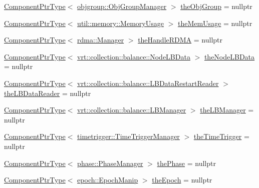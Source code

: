 \begin{DoxyCompactItemize}
\item 
\hyperlink{structvt_1_1runtime_1_1_runtime_a0893bf0a8c03b898e8ab66b52cec80ad}{Component\+Ptr\+Type}$<$ \hyperlink{structvt_1_1objgroup_1_1_obj_group_manager}{objgroup\+::\+Obj\+Group\+Manager} $>$ \hyperlink{structvt_1_1runtime_1_1_runtime_af2d01d5059edf4aed086f087e5ed1e91}{the\+Obj\+Group} = nullptr
\item 
\hyperlink{structvt_1_1runtime_1_1_runtime_a0893bf0a8c03b898e8ab66b52cec80ad}{Component\+Ptr\+Type}$<$ \hyperlink{structvt_1_1util_1_1memory_1_1_memory_usage}{util\+::memory\+::\+Memory\+Usage} $>$ \hyperlink{structvt_1_1runtime_1_1_runtime_a99d9a28de0742915ca6b25393807dd8b}{the\+Mem\+Usage} = nullptr
\item 
\hyperlink{structvt_1_1runtime_1_1_runtime_a0893bf0a8c03b898e8ab66b52cec80ad}{Component\+Ptr\+Type}$<$ \hyperlink{structvt_1_1rdma_1_1_manager}{rdma\+::\+Manager} $>$ \hyperlink{structvt_1_1runtime_1_1_runtime_a4772a2e3ae26f5dae29ea474ac0050c7}{the\+Handle\+R\+D\+MA} = nullptr
\item 
\hyperlink{structvt_1_1runtime_1_1_runtime_a0893bf0a8c03b898e8ab66b52cec80ad}{Component\+Ptr\+Type}$<$ \hyperlink{structvt_1_1vrt_1_1collection_1_1balance_1_1_node_l_b_data}{vrt\+::collection\+::balance\+::\+Node\+L\+B\+Data} $>$ \hyperlink{structvt_1_1runtime_1_1_runtime_a0a596fabff7d26a9417e8f7886410eee}{the\+Node\+L\+B\+Data} = nullptr
\item 
\hyperlink{structvt_1_1runtime_1_1_runtime_a0893bf0a8c03b898e8ab66b52cec80ad}{Component\+Ptr\+Type}$<$ \hyperlink{structvt_1_1vrt_1_1collection_1_1balance_1_1_l_b_data_restart_reader}{vrt\+::collection\+::balance\+::\+L\+B\+Data\+Restart\+Reader} $>$ \hyperlink{structvt_1_1runtime_1_1_runtime_afb8103d823cabc7bacb6035f785e9324}{the\+L\+B\+Data\+Reader} = nullptr
\item 
\hyperlink{structvt_1_1runtime_1_1_runtime_a0893bf0a8c03b898e8ab66b52cec80ad}{Component\+Ptr\+Type}$<$ \hyperlink{structvt_1_1vrt_1_1collection_1_1balance_1_1_l_b_manager}{vrt\+::collection\+::balance\+::\+L\+B\+Manager} $>$ \hyperlink{structvt_1_1runtime_1_1_runtime_a0d324f5964ce89e2974a41bc3129829e}{the\+L\+B\+Manager} = nullptr
\item 
\hyperlink{structvt_1_1runtime_1_1_runtime_a0893bf0a8c03b898e8ab66b52cec80ad}{Component\+Ptr\+Type}$<$ \hyperlink{structvt_1_1timetrigger_1_1_time_trigger_manager}{timetrigger\+::\+Time\+Trigger\+Manager} $>$ \hyperlink{structvt_1_1runtime_1_1_runtime_a3d72d73ecd4ba3f0104dca596eae3862}{the\+Time\+Trigger} = nullptr
\item 
\hyperlink{structvt_1_1runtime_1_1_runtime_a0893bf0a8c03b898e8ab66b52cec80ad}{Component\+Ptr\+Type}$<$ \hyperlink{structvt_1_1phase_1_1_phase_manager}{phase\+::\+Phase\+Manager} $>$ \hyperlink{structvt_1_1runtime_1_1_runtime_aaad9fd5e7f0bb2d4bcc73fe1ce60bd9f}{the\+Phase} = nullptr
\item 
\hyperlink{structvt_1_1runtime_1_1_runtime_a0893bf0a8c03b898e8ab66b52cec80ad}{Component\+Ptr\+Type}$<$ \hyperlink{structvt_1_1epoch_1_1_epoch_manip}{epoch\+::\+Epoch\+Manip} $>$ \hyperlink{structvt_1_1runtime_1_1_runtime_aa126046508c7d6e6d8470fec07160c8e}{the\+Epoch} = nullptr
\end{DoxyCompactItemize}
